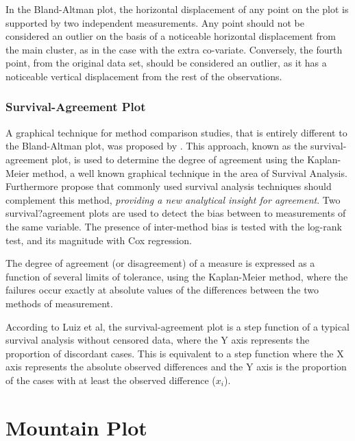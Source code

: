 \documentclass[Main.tex]{subfiles}
\begin{document}
In the Bland-Altman plot, the horizontal displacement of any point on the plot is supported by two independent measurements. Any point should not be considered an outlier on the basis of a noticeable horizontal displacement from the main cluster, as in the case with the extra co-variate. Conversely, the fourth point, from the original data set, should be considered an outlier, as it has a noticeable vertical displacement from the rest of the observations.

	
\subsubsection{Survival-Agreement Plot}
A graphical technique for method comparison studies, that is entirely different to the Bland-Altman plot, was proposed by \citet{luiz}. This approach, known as the survival-agreement plot, is used to determine the degree of agreement using the Kaplan-Meier method, a well known graphical technique in the area of Survival Analysis. Furthermore \citet{luiz} propose that commonly used survival analysis techniques should complement this method,\textit{ providing a new analytical insight for agreement}. Two survival?agreement plots are used to detect the bias between to measurements of the same variable. The presence of inter-method bias is tested with the log-rank test, and its magnitude with Cox regression.
	
	
The degree of agreement (or disagreement) of a measure is expressed as a function of several limits of tolerance, using the Kaplan-Meier method, where the failures occur exactly at absolute values of the differences between the two methods of measurement. 
	
According to Luiz et al, the survival-agreement plot is a step function of a typical survival analysis without censored data, where the Y axis represents the proportion of discordant cases. This is equivalent to a step function where the X axis represents the absolute  observed differences and the Y axis is the proportion of the cases with at least the observed difference ($x_i$). 
	
	
\section*{Mountain Plot}
\end{document}
